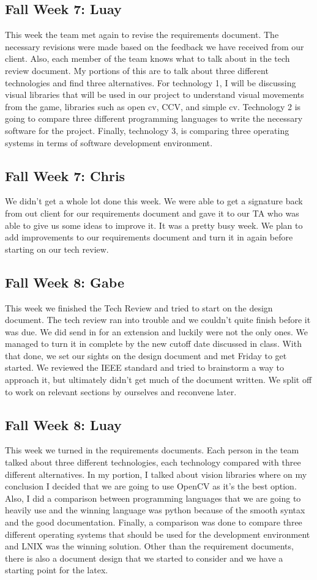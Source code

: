 \documentclass[onecolumn, draftclsnofoot,10pt, compsoc]{IEEEtran}
\begin{document}
\subsection{Fall Week 7: Luay}
This week the team met again to revise the requirements document. The necessary revisions were made based on the feedback we have received from our client. Also, each member of the team knows what to talk about in the tech review document. My portions of this are to talk about three different technologies and find three alternatives. For technology 1, I will be discussing visual libraries that will be used in our project to understand visual movements from the game, libraries such as open cv, CCV, and simple cv. Technology 2 is going to compare three different programming languages to write the necessary software for the project. Finally, technology 3, is comparing three operating systems in terms of software development environment.
\subsection{Fall Week 7: Chris}
We didn't get a whole lot done this week. We were able to get a signature back from out client for our requirements document and gave it to our TA who was able to give us some ideas to improve it. It was a pretty busy week. We plan to add improvements to our requirements document and turn it in again before starting on our tech review.
\subsection{Fall Week 8: Gabe}
This week we finished the Tech Review and tried to start on the design document. The tech review ran into trouble and we couldn't quite finish before it was due. We did send in for an extension and luckily were not the only ones. We managed to turn it in complete by the new cutoff date discussed in class. With that done, we set our sights on the design document and met Friday to get started. We reviewed the IEEE standard and tried to brainstorm a way to approach it, but ultimately didn't get much of the document written. We split off to work on relevant sections by ourselves and reconvene later.
\subsection{Fall Week 8: Luay}
This week we turned in the requirements documents. Each person in the team talked about three different technologies, each technology compared with three different alternatives. In my portion, I talked about vision libraries where on my conclusion I decided that we are going to use OpenCV as it’s the best option. Also, I did a comparison between programming languages that we are going to heavily use and the winning language was python because of the smooth syntax and the good documentation. Finally, a comparison was done to compare three different operating systems that should be used for the development environment and LNIX was the winning solution. Other than the requirement documents, there is also a document design that we started to consider and we have a starting point for the latex.
\end{document}
